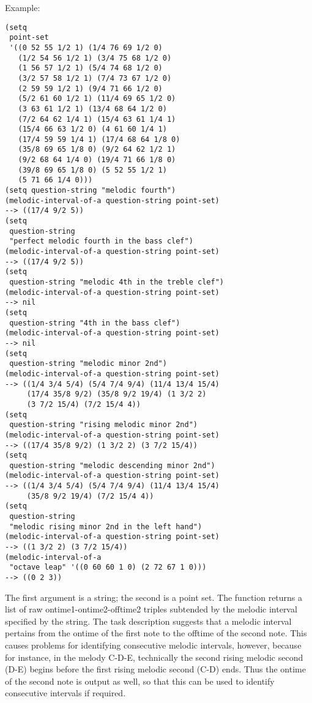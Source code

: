 \vspace{0.5cm}
\noindent Example:
\begin{verbatim}
(setq
 point-set
 '((0 52 55 1/2 1) (1/4 76 69 1/2 0)
   (1/2 54 56 1/2 1) (3/4 75 68 1/2 0)
   (1 56 57 1/2 1) (5/4 74 68 1/2 0)
   (3/2 57 58 1/2 1) (7/4 73 67 1/2 0)
   (2 59 59 1/2 1) (9/4 71 66 1/2 0)
   (5/2 61 60 1/2 1) (11/4 69 65 1/2 0)
   (3 63 61 1/2 1) (13/4 68 64 1/2 0)
   (7/2 64 62 1/4 1) (15/4 63 61 1/4 1)
   (15/4 66 63 1/2 0) (4 61 60 1/4 1)
   (17/4 59 59 1/4 1) (17/4 68 64 1/8 0)
   (35/8 69 65 1/8 0) (9/2 64 62 1/2 1)
   (9/2 68 64 1/4 0) (19/4 71 66 1/8 0)
   (39/8 69 65 1/8 0) (5 52 55 1/2 1)
   (5 71 66 1/4 0)))
(setq question-string "melodic fourth")
(melodic-interval-of-a question-string point-set)
--> ((17/4 9/2 5))
(setq
 question-string
 "perfect melodic fourth in the bass clef")
(melodic-interval-of-a question-string point-set)
--> ((17/4 9/2 5))
(setq
 question-string "melodic 4th in the treble clef")
(melodic-interval-of-a question-string point-set)
--> nil
(setq
 question-string "4th in the bass clef")
(melodic-interval-of-a question-string point-set)
--> nil
(setq
 question-string "melodic minor 2nd")
(melodic-interval-of-a question-string point-set)
--> ((1/4 3/4 5/4) (5/4 7/4 9/4) (11/4 13/4 15/4)
     (17/4 35/8 9/2) (35/8 9/2 19/4) (1 3/2 2)
     (3 7/2 15/4) (7/2 15/4 4))
(setq
 question-string "rising melodic minor 2nd")
(melodic-interval-of-a question-string point-set)
--> ((17/4 35/8 9/2) (1 3/2 2) (3 7/2 15/4))
(setq
 question-string "melodic descending minor 2nd")
(melodic-interval-of-a question-string point-set)
--> ((1/4 3/4 5/4) (5/4 7/4 9/4) (11/4 13/4 15/4)
     (35/8 9/2 19/4) (7/2 15/4 4))
(setq
 question-string
 "melodic rising minor 2nd in the left hand")
(melodic-interval-of-a question-string point-set)
--> ((1 3/2 2) (3 7/2 15/4))
(melodic-interval-of-a
 "octave leap" '((0 60 60 1 0) (2 72 67 1 0)))
--> ((0 2 3))
\end{verbatim}

\noindent The first argument is a string; the second
is a point set. The function returns a list of raw
ontime1-ontime2-offtime2 triples subtended by the
melodic interval specified by the string. The task
description suggests that a melodic interval pertains
from the ontime of the first note to the offtime of the
second note. This causes problems for identifying
consecutive melodic intervals, however, because for
instance, in the melody C-D-E, technically the second
rising melodic second (D-E) begins before the first
rising melodic second (C-D) ends. Thus the ontime of
the second note is output as well, so that this can be
used to identify consecutive intervals if required.

